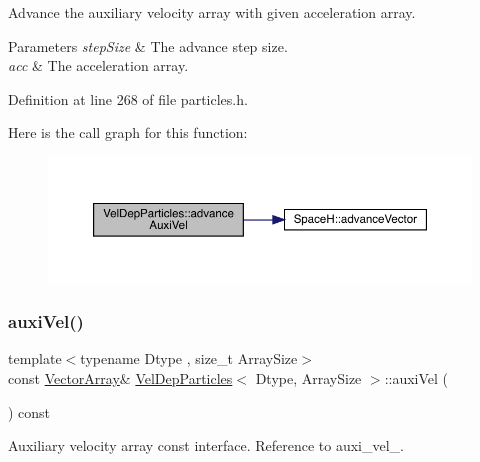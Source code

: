 Advance the auxiliary velocity array with given acceleration array. 


\begin{DoxyParams}{Parameters}
{\em step\+Size} & The advance step size. \\
\hline
{\em acc} & The acceleration array. \\
\hline
\end{DoxyParams}


Definition at line 268 of file particles.\+h.

Here is the call graph for this function\+:\nopagebreak
\begin{figure}[H]
\begin{center}
\leavevmode
\includegraphics[width=350pt]{class_vel_dep_particles_a01ef2a76b8cb3b53eb92e41104a3df6f_cgraph}
\end{center}
\end{figure}
\mbox{\label{class_vel_dep_particles_a90f7baf617b3419dac92fc4d0b6388e9}} 
\subsubsection{\texorpdfstring{auxi\+Vel()}{auxiVel()}\hspace{0.1cm}{\footnotesize\ttfamily [1/2]}}
{\footnotesize\ttfamily template$<$typename Dtype , size\+\_\+t Array\+Size$>$ \\
const \mbox{\hyperlink{class_vel_indep_particles_a27580f65b6523bfb6900520af2e44708}{Vector\+Array}}\& \mbox{\hyperlink{class_vel_dep_particles}{Vel\+Dep\+Particles}}$<$ Dtype, Array\+Size $>$\+::auxi\+Vel (\begin{DoxyParamCaption}{ }\end{DoxyParamCaption}) const\hspace{0.3cm}{\ttfamily [inline]}}



Auxiliary velocity array const interface. Reference to auxi\+\_\+vel\+\_\+. 



